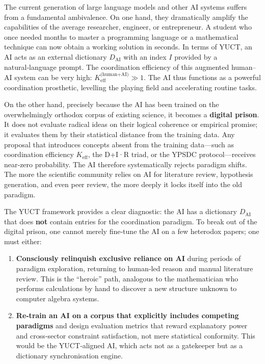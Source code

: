 \documentclass[12pt,a4paper]{article}
\begin{document}
	The current generation of large language models and other AI systems suffers from a fundamental ambivalence. On one hand, they dramatically amplify the capabilities of the average researcher, engineer, or entrepreneur. A student who once needed months to master a programming language or a mathematical technique can now obtain a working solution in seconds. In terms of YUCT, an AI acts as an external dictionary \(D_{\text{AI}}\) with an index \(I\) provided by a natural‑language prompt. The coordination efficiency of this augmented human–AI system can be very high: \(K_{\mathrm{eff}}^{\text{(human+AI)}} \gg 1\). The AI thus functions as a powerful coordination prosthetic, levelling the playing field and accelerating routine tasks.
	
	On the other hand, precisely because the AI has been trained on the overwhelmingly orthodox corpus of existing science, it becomes a \textbf{digital prison}. It does not evaluate radical ideas on their logical coherence or empirical promise; it evaluates them by their statistical distance from the training data. Any proposal that introduces concepts absent from the training data—such as coordination efficiency \(K_{\mathrm{eff}}\), the D+I·R triad, or the YPSDC protocol—receives near‑zero probability. The AI therefore systematically rejects paradigm shifts. The more the scientific community relies on AI for literature review, hypothesis generation, and even peer review, the more deeply it locks itself into the old paradigm.
	
	The YUCT framework provides a clear diagnostic: the AI has a dictionary \(D_{\text{AI}}\) that does \textbf{not} contain entries for the coordination paradigm. To break out of the digital prison, one cannot merely fine‑tune the AI on a few heterodox papers; one must either:
	
	\begin{enumerate}
		\item \textbf{Consciously relinquish exclusive reliance on AI} during periods of paradigm exploration, returning to human‑led reason and manual literature review. This is the “heroic” path, analogous to the mathematician who performs calculations by hand to discover a new structure unknown to computer algebra systems.
		\item \textbf{Re‑train an AI on a corpus that explicitly includes competing paradigms} and design evaluation metrics that reward explanatory power and cross‑sector constraint satisfaction, not mere statistical conformity. This would be the YUCT‑aligned AI, which acts not as a gatekeeper but as a dictionary synchronisation engine.
	\end{enumerate}
	
\end{document}
